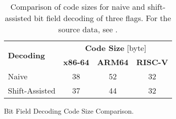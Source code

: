 \begin{table}[htb]
  \centering
  \begin{tabular}{l c c c}
    \toprule
    \multirow{2}{*}[-2pt]{\textbf{Decoding}} & \multicolumn{3}{c}{\textbf{Code Size} [byte]}\\
    \cmidrule{2-4}
    & \textbf{x86-64} & \textbf{ARM64} & \textbf{RISC-V}\\
    \midrule
    Naive & 38 & 52 & 32\\
    Shift-Assisted & 37 & 44 & 32\\
    \bottomrule
  \end{tabular}
  \caption{Bit Field Decoding Code Size Comparison.}
  \label{fig:field_flag_dec_sizes}
  \caption*{Comparison of code sizes for naive and shift-assisted bit field decoding of three flags. For the source data, see .}
\end{table}
